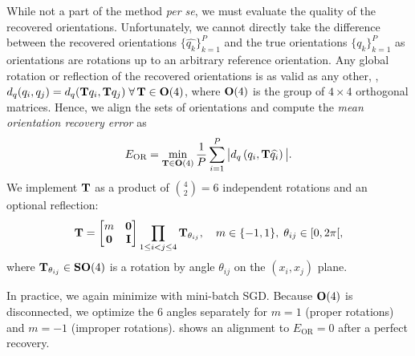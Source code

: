 While not a part of the method \textit{per se}, we must evaluate the quality of the recovered orientations.
Unfortunately, we cannot directly take the difference between the recovered orientations $\{\widehat{q_k}\}_{k=1}^P$ and the true orientations $\{q_k\}_{k=1}^P$ as orientations are rotations up to an arbitrary reference orientation.
Any global rotation or reflection of the recovered orientations is as valid as any other, \ie, $d_q(q_i, q_j) = d_q(\mathbf{T} q_i , \mathbf{T} q_j) \; \forall \, \mathbf{T} \in \mathrm{\mathbf{O}}(4)$, where $\mathrm{\mathbf{O}}(4)$ is the group of $4 \times 4$ orthogonal matrices. %
Hence, we align the sets of orientations and compute the \textit{mean orientation recovery error} as
\begin{equation}
    E_\text{OR} = \min_{\mathbf{T} \in \mathrm{\mathbf{O}}(4)} \frac{1}{P} \sum_{i=1}^P \big| d_q\left( q_i, \mathbf{T} \widehat{q_i} \right) \big|.
    \label{eqn:orientation-recovery-error}
\end{equation}
We implement $\mathbf{T}$ as a product of $\binom{4}{2}=6$ independent rotations and an optional reflection:
\begin{equation}
    \mathbf{T} =
    \begin{bmatrix}
        m & \mathbf{0} \\
        \mathbf{0} & \mathbf{I} \\
    \end{bmatrix}
    \prod_{1 \leq i < j \leq 4} \mathbf{T}_{\theta_{ij}},
    \quad m \in \{-1,1\}, \; \theta_{ij} \in [0, 2\pi[,
\end{equation}
where $\mathbf{T}_{\theta_{ij}} \in \mathrm{\mathbf{SO}}(4)$ is a rotation by angle $\theta_{ij}$ on the $(x_i, x_j)$ plane.

In practice, we again minimize  with mini-batch SGD.
Because $\mathrm{\mathbf{O}}(4)$ is disconnected, we optimize the 6 angles separately for $m = 1$ (proper rotations) and $m = -1$ (improper rotations).
 shows an alignment to $E_{\text{OR}}=0$ after a perfect recovery.

